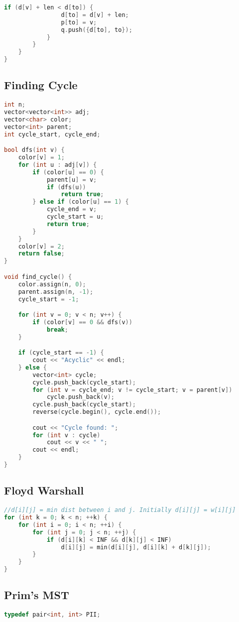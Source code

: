 \documentclass[10pt,a4paper,landscape]{article}
\begin{document}
\begin{multicols}{3}
\begin{lstlisting}[language=C++, breaklines=true]
            if (d[v] + len < d[to]) {
                d[to] = d[v] + len;
                p[to] = v;
                q.push({d[to], to});
            }
        }
    }
}
\end{lstlisting}

\subsection{Finding Cycle}
\begin{lstlisting}[language=C++, breaklines=true]
int n;
vector<vector<int>> adj;
vector<char> color;
vector<int> parent;
int cycle_start, cycle_end;

bool dfs(int v) {
    color[v] = 1;
    for (int u : adj[v]) {
        if (color[u] == 0) {
            parent[u] = v;
            if (dfs(u))
                return true;
        } else if (color[u] == 1) {
            cycle_end = v;
            cycle_start = u;
            return true;
        }
    }
    color[v] = 2;
    return false;
}

void find_cycle() {
    color.assign(n, 0);
    parent.assign(n, -1);
    cycle_start = -1;

    for (int v = 0; v < n; v++) {
        if (color[v] == 0 && dfs(v))
            break;
    }

    if (cycle_start == -1) {
        cout << "Acyclic" << endl;
    } else {
        vector<int> cycle;
        cycle.push_back(cycle_start);
        for (int v = cycle_end; v != cycle_start; v = parent[v])
            cycle.push_back(v);
        cycle.push_back(cycle_start);
        reverse(cycle.begin(), cycle.end());

        cout << "Cycle found: ";
        for (int v : cycle)
            cout << v << " ";
        cout << endl;
    }
}
\end{lstlisting}

\subsection{Floyd Warshall}
\begin{lstlisting}[language=C++, breaklines=true]
//d[i][j] = min dist between i and j. Initially d[i][j] = w[i][j]
for (int k = 0; k < n; ++k) {
    for (int i = 0; i < n; ++i) {
        for (int j = 0; j < n; ++j) {
            if (d[i][k] < INF && d[k][j] < INF)
                d[i][j] = min(d[i][j], d[i][k] + d[k][j]); 
        }
    }
}
\end{lstlisting}

\subsection{Prim's MST}
\begin{lstlisting}[language=C++, breaklines=true]
typedef pair<int, int> PII;


\end{lstlisting}
\end{multicols}
\end{document}
